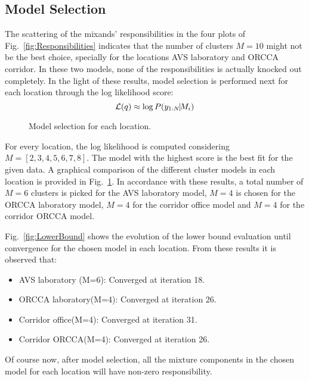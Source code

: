\break
\newpage
\subsection{Model Selection}
The scattering of the mixands' responsibilities in the four plots of Fig.~\ref{fig:Responsibilities} indicates that 
the number of clusters $M=10$ might not be the best choice, specially for the locations 
AVS laboratory and ORCCA corridor. In these two models, none of the responsibilities is actually knocked out completely. 
In the light of these results,   model selection is performed next for each location 
through the log likelihood score:%
\begin{equation}
	\mathcal{L}(q) \approx \log P(y_{1:N} \vline M_i)
\end{equation}

\begin{figure}[!h]
	\centering
	\caption{Model selection for each location.}
	\label{fig:ModelSelection}
\end{figure}

For every location, the log likelihood is computed considering 
$M = [2, 3, 4, 5, 6, 7, 8]$. The model with the highest score is the best fit for the given data. 
A graphical comparison of the different cluster models in each location is provided in Fig.~\ref{fig:ModelSelection}. 
In accordance with these results, %
a total number of $M = 6$ clusters is picked for the AVS laboratory model, 
$M = 4$ is chosen for the ORCCA laboratory model, 
$M = 4$ for the corridor office model and 
$M = 4$ for the corridor ORCCA model.

Fig.~\ref{fig:LowerBound} shows the evolution of the lower bound evaluation until convergence for the 
chosen model in each location. 
From these results it is observed that: 
\begin{itemize}
	\item{AVS laboratory (M=6): }
	Converged at iteration 18.
	\item{ORCCA laboratory(M=4): }
	Converged at iteration 26.
	\item{Corridor office(M=4): }
	Converged at iteration 31.
	\item{Corridor ORCCA(M=4): }
	Converged at iteration 26.
\end{itemize}
Of course now, after model selection, all the mixture components in the chosen model for each location 
will have non-zero responsibility. 

